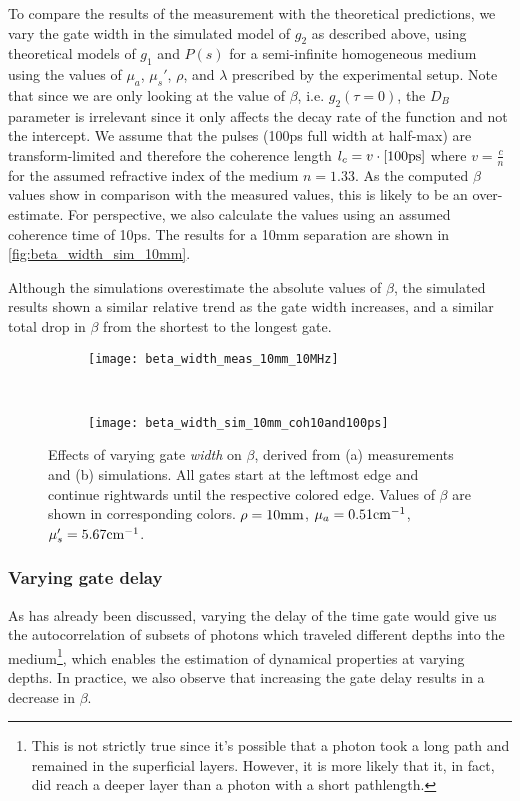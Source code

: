 To compare the results of the measurement with the theoretical predictions, we vary the gate width in the simulated model of $g_2$ as described above, using theoretical models of $g_1$ and $P(s)$ for a semi-infinite homogeneous medium using the values of $\mu_a$, $\mu_s'$, $\rho$, and $\lambda$ prescribed by the experimental setup. Note that since we are only looking at the value of $\beta$, i.e. $g_2(\tau=0)$, the $D_B$ parameter is irrelevant since it only affects the decay rate of the function and not the intercept. We assume that the pulses (100ps full width at half-max) are transform-limited and therefore the coherence length $l_c = v \cdot [100\textnormal{ps}]$ where $v = \frac{c}{n}$ for the assumed refractive index of the medium $n=1.33$. As the computed $\beta$ values show in comparison with the measured values, this is likely to be an over-estimate. For perspective, we also calculate the values using an assumed coherence time of 10ps. The results for a 10mm separation are shown in \autoref{fig:beta_width_sim_10mm}. 

Although the simulations overestimate the absolute values of $\beta$, the simulated results shown a similar relative trend as the gate width increases, and a similar total drop in $\beta$ from the shortest to the longest gate.


\begin{sidewaysfigure}
    \begin{subfigure}{0.49\textwidth}
        \centering
        \texttt{[image: beta\_width\_meas\_10mm\_10MHz]}
        \caption{}
    \label{fig:beta_width_meas_10mm}
    \end{subfigure}~%
    \begin{subfigure}{0.49\textwidth}
        \centering
        \texttt{[image: beta\_width\_sim\_10mm\_coh10and100ps]}
        \caption{}
        \label{fig:beta_width_sim_10mm}
    \end{subfigure}
    \caption{Effects of varying gate \emph{width} on $\beta$, derived from (a) measurements and (b) simulations. All gates start at the leftmost edge and continue rightwards until the respective colored edge. Values of $\beta$ are shown in corresponding colors. $\rho=10\textnormal{mm}$, $\mu_a=0.51\textnormal{cm}^{-1}$, $\mu_s'=5.67\textnormal{cm}^{-1}$.}
    \label{fig:beta_width_10mm}
\end{sidewaysfigure}


\subsubsection{Varying gate delay}
As has already been discussed, varying the delay of the time gate would give us the autocorrelation of subsets of photons which traveled different depths into the medium\footnote{This is not strictly true since it's possible that a photon took a long path and remained in the superficial layers. However, it is more likely that it, in fact, did reach a deeper layer than a photon with a short pathlength.}, which enables the estimation of dynamical properties at varying depths. In practice, we also observe that increasing the gate delay results in a decrease in $\beta$. 


